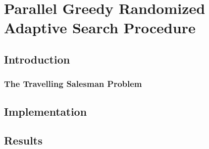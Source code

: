\chapter{Parallel Greedy Randomized Adaptive Search Procedure}
\label{chap:pgrasp}
\section{Introduction}
\subsection{The Travelling Salesman Problem}
\section{Implementation}
\section{Results}

